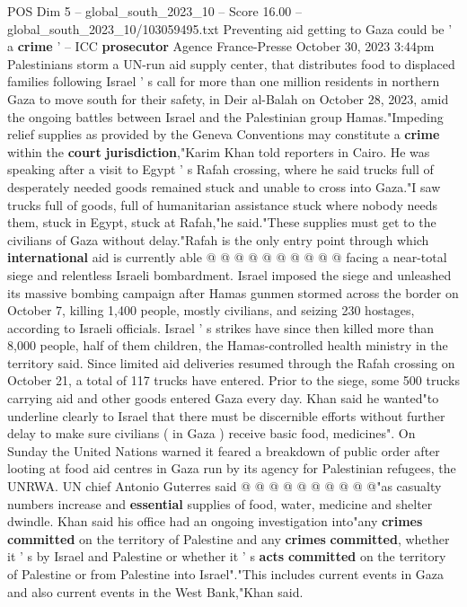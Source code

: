 \begin{textsample}{POS Dim 5 – global\_south\_2023\_10 – Score 16.00 – global\_south\_2023\_10/103059495.txt}  \label{ex:f5_pos_382}
Preventing aid getting to Gaza could be ' a \textbf{crime} ' -- ICC \textbf{prosecutor} Agence France-Presse October 30, 2023 3:44pm Palestinians storm a UN-run aid supply center, that distributes food to displaced families following Israel ' s call for more than one million residents in northern Gaza to move south for their safety, in Deir al-Balah on October 28, 2023, amid the ongoing battles between Israel and the Palestinian group Hamas."Impeding relief supplies as provided by the Geneva Conventions may constitute a \textbf{crime} within the \textbf{court} \textbf{jurisdiction},"Karim Khan told reporters in Cairo.
He was speaking after a visit to Egypt ' s Rafah crossing, where he said trucks full of desperately needed goods remained stuck and unable to cross into Gaza."I saw trucks full of goods, full of humanitarian assistance stuck where nobody needs them, stuck in Egypt, stuck at Rafah,"he said."These supplies must get to the civilians of Gaza without delay."Rafah is the only entry point through which \textbf{international} aid is currently able @ @ @ @ @ @ @ @ @ @ facing a near-total siege and relentless Israeli bombardment.
Israel imposed the siege and unleashed its massive bombing campaign after Hamas gunmen stormed across the border on October 7, killing 1,400 people, mostly civilians, and seizing 230 hostages, according to Israeli officials.
Israel ' s strikes have since then killed more than 8,000 people, half of them children, the Hamas-controlled health ministry in the territory said.
Since limited aid deliveries resumed through the Rafah crossing on October 21, a total of 117 trucks have entered.
Prior to the siege, some 500 trucks carrying aid and other goods entered Gaza every day.
Khan said he wanted"to underline clearly to Israel that there must be discernible efforts without further delay to make sure civilians ( in Gaza ) receive basic food, medicines".
On Sunday the United Nations warned it feared a breakdown of public order after looting at food aid centres in Gaza run by its agency for Palestinian refugees, the UNRWA.
UN chief Antonio Guterres said @ @ @ @ @ @ @ @ @ @"as casualty numbers increase and \textbf{essential} supplies of food, water, medicine and shelter dwindle.
Khan said his office had an ongoing investigation into"any \textbf{crimes} \textbf{committed} on the territory of Palestine and any \textbf{crimes} \textbf{committed}, whether it ' s by Israel and Palestine or whether it ' s \textbf{acts} \textbf{committed} on the territory of Palestine or from Palestine into Israel"."This includes current events in Gaza and also current events in the West Bank,"Khan said.

\end{textsample}
